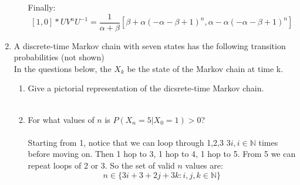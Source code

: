 \begin{enumerate}
\begin{enumerate}
       Finally:
       $$[1,0] * UV^nU^{-1} = \frac{1}{\alpha + \beta} [\beta + \alpha(-\alpha-\beta+1)^n, \alpha - \alpha(-\alpha - \beta + 1)^n]$$
       
    \end{enumerate}

  \item A discrete-time Markov chain with seven states has the following transition probabilities (not shown)\\

    In the questions below, the $X_k$ be the state of the Markov chain at time k.
    \begin{enumerate}
      \item Give a pictorial representation of the dicsrete-time Markov chain.\\\\
        \begin{figure}[H]
        \end{figure}

      \item For what values of $n$ is $P(X_n = 5 | X_0 = 1) > 0$?\\\\

        Starting from 1, notice that we can loop through 1,2,3 $3i, i \in \mathds{N}$ times before moving on. Then 1 hop to 3, 1 hop to 4, 1 hop to 5. From 5 we can repeat loops of 2 or 3. So the set of valid $n$ values are:
        $$n \in \{3i + 3 + 2j + 3k: i,j,k \in \mathds{N}\}$$


\end{enumerate}
\end{enumerate}
